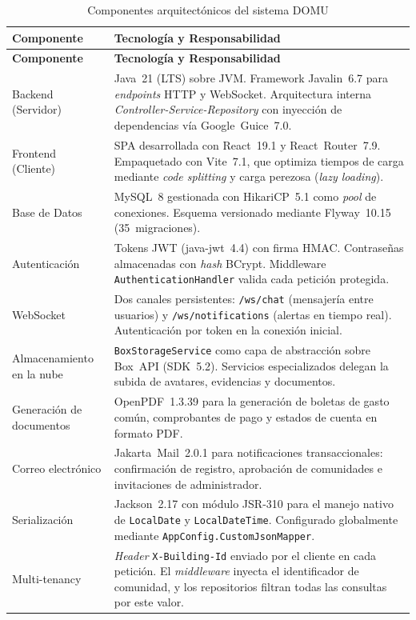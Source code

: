 \begin{longtable}{|p{}|p{}|}
\caption{Componentes arquitectónicos del sistema DOMU}\label{tab:arquitectura-componentes}\\
\hline
\textbf{Componente} & \textbf{Tecnología y Responsabilidad} \\
\hline
\endfirsthead
\hline
\textbf{Componente} & \textbf{Tecnología y Responsabilidad} \\
\hline
\endhead
\hline
\endfoot

Backend (Servidor) &
Java~21 (LTS) sobre JVM. Framework Javalin~6.7 para \textit{endpoints} HTTP y WebSocket. Arquitectura interna \textit{Controller-Service-Repository} con inyección de dependencias vía Google~Guice~7.0. \\
\hline

Frontend (Cliente) &
SPA desarrollada con React~19.1 y React~Router~7.9. Empaquetado con Vite~7.1, que optimiza tiempos de carga mediante \textit{code splitting} y carga perezosa (\textit{lazy loading}). \\
\hline

Base de Datos &
MySQL~8 gestionada con HikariCP~5.1 como \textit{pool} de conexiones. Esquema versionado mediante Flyway~10.15 (35~migraciones). \\
\hline

Autenticación &
Tokens JWT (java-jwt~4.4) con firma HMAC. Contraseñas almacenadas con \textit{hash} BCrypt. Middleware \texttt{AuthenticationHandler} valida cada petición protegida. \\
\hline

WebSocket &
Dos canales persistentes: \texttt{/ws/chat} (mensajería entre usuarios) y \texttt{/ws/notifications} (alertas en tiempo real). Autenticación por token en la conexión inicial. \\
\hline

Almacenamiento en la nube &
\texttt{BoxStorageService} como capa de abstracción sobre Box~API (SDK~5.2). Servicios especializados delegan la subida de avatares, evidencias y documentos. \\
\hline

Generación de documentos &
OpenPDF~1.3.39 para la generación de boletas de gasto común, comprobantes de pago y estados de cuenta en formato PDF. \\
\hline

Correo electrónico &
Jakarta~Mail~2.0.1 para notificaciones transaccionales: confirmación de registro, aprobación de comunidades e invitaciones de administrador. \\
\hline

Serialización &
Jackson~2.17 con módulo JSR-310 para el manejo nativo de \texttt{LocalDate} y \texttt{LocalDateTime}. Configurado globalmente mediante \texttt{AppConfig.CustomJsonMapper}. \\
\hline

Multi-tenancy &
\textit{Header} \texttt{X-Building-Id} enviado por el cliente en cada petición. El \textit{middleware} inyecta el identificador de comunidad, y los repositorios filtran todas las consultas por este valor. \\

\end{longtable}

